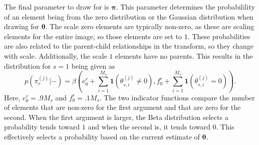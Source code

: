 \documentclass{IEEEtran}
\begin{document}
The final parameter to draw for is $\mathbf{\pi}$.  This parameter
determines the probabilility of an element being from the zero
distribution or the Gaussian distribution when drawing for
$\mathbf{\theta}$.  The scale zero elements are typically non-zero, as
these are scaling elements for the entire image, so those elements are
set to $1$.  These probabilities are also related to the parent-child
relationships in the transform, so they change with scale.
Additionally, the scale $1$ elements have no parents.  This results in
the distribution for $s=1$ being given as
\begin{equation}
    p(\pi_r^{(j)}|-)  = 
    \beta(e_0^r+\sum_{i=1}^{M_s}\mathbf{1}(\theta_{s,i}^{(j)}\neq
    0), f_0^r +\sum_{i=1}^{M_s}\mathbf{1}(\theta_{s,i}^{(j)}= 0)).
\label{pir}
\end{equation}
Here, $e_0^r = .9M_s$ and $f_0^r = .1M_s$.  The two indicator functions compare the number of elements that are
non-zero for the first argument and that are zero for the second.
When the first argument is larger, the Beta distribution selects a probability tends toward $1$
and when the second is, it tends toward $0$.  This effectively selects
a probability based on the current estimate of $\mathbf{\theta}$.
\end{document}
